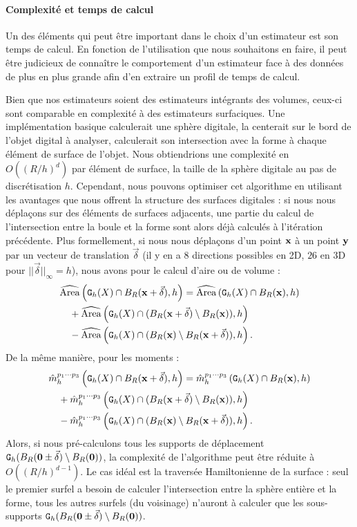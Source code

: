 \paragraph{Complexité et temps de calcul}
%
Un des éléments qui peut être important dans le choix d'un estimateur est son
temps de calcul. En fonction de l'utilisation que nous souhaitons en faire, il
peut être judicieux de connaître le comportement d'un estimateur face à des
données de plus en plus grande afin d'en extraire un profil de temps de calcul.


Bien que nos estimateurs soient des estimateurs intégrants des volumes, ceux-ci
sont comparable en complexité à des estimateurs surfaciques. Une implémentation
basique calculerait une sphère digitale, la centerait sur le bord de l'objet
digital à analyser, calculerait son intersection avec la forme à chaque élément
de surface de l'objet. Nous obtiendrions une complexité en $O((R/h)^{d})$ par
élément de surface, \cad la taille de la sphère digitale au pas de
discrétisation $h$. Cependant, nous pouvons optimiser cet algorithme en
utilisant les avantages que nous offrent la structure des surfaces digitales :
si nous nous déplaçons sur des éléments de surfaces adjacents, une partie du
calcul de l'intersection entre la boule et la forme sont alors déjà calculés à
l'itération précédente. Plus formellement, si nous nous déplaçons d'un point
$\vx$ à un point $\vy$ par un vecteur de translation $\vec{\delta}$ (il y en a
$8$ directions possibles en 2D, $26$ en 3D pour $||\vec{\delta}||_\infty = h$),
nous avons pour le calcul d'aire ou de volume :
%
\begin{align}
  & \AreaC\left(\DSh \cap \Ball{R}{\vx + \vec{\delta}}, h\right) =
  \AreaC\left(\DSh \cap \Ball{R}{\vx}, h\right) \\
  &\quad + \AreaC\left(\DSh \cap (\Ball{R}{\vx + \vec{\delta}} \setminus \Ball{R}{\vx} ), h\right) \\
  &\quad - \AreaC\left(\DSh \cap ( \Ball{R}{\vx} \setminus \Ball{R}{\vx + \vec{\delta}}),h\right) .
\end{align}
%
De la même manière, pour les moments :
%
\begin{align}
  & \DMom{p_1 \cdots p_3}{h}\left(\DSh \cap \Ball{R}{\vx + \vec{\delta}}, h\right) =
  \DMom{p_1 \cdots p_3}{h}\left(\DSh \cap \Ball{R}{\vx}, h\right) \\
  &\quad + \DMom{p_1 \cdots p_3}{h}\left(\DSh \cap ( \Ball{R}{\vx+ \vec{\delta}} \setminus \Ball{R}{\vx} ), h\right)\\
  &\quad - \DMom{p_1 \cdots p_3}{h}\left(\DSh \cap ( \Ball{R}{\vx} \setminus \Ball{R}{\vx+ \vec{\delta}} ), h\right) .
\end{align}
%
Alors, si nous pré-calculons tous les supports de déplacement
$\DigF{\Ball{R}{\mathbf{0} \pm \vec{\delta}} \setminus
\Ball{R}{\mathbf{0}}}{h}$, la complexité de l'algorithme peut être réduite à
$O((R/h)^{d-1})$. Le cas idéal est la traversée Hamiltonienne de la surface :
seul le premier surfel a besoin de calculer l'intersection entre la sphère
entière et la forme, tous les autres surfels (du voisinage) n'auront à calculer
que les sous-supports $\DigF{\Ball{R}{\mathbf{0} \pm \vec{\delta}} \setminus
\Ball{R}{\mathbf{0}}}{h}$.


